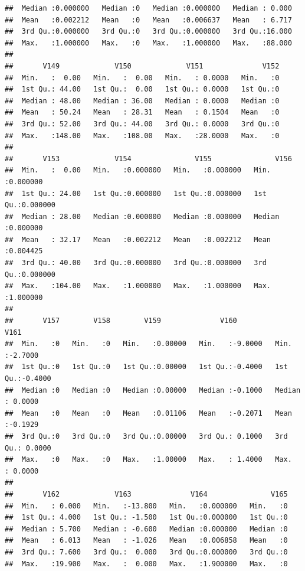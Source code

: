 \documentclass[
]{article}
\begin{document}
\begin{verbatim}
##  Median :0.000000   Median :0   Median :0.000000   Median : 0.000  
##  Mean   :0.002212   Mean   :0   Mean   :0.006637   Mean   : 6.717  
##  3rd Qu.:0.000000   3rd Qu.:0   3rd Qu.:0.000000   3rd Qu.:16.000  
##  Max.   :1.000000   Max.   :0   Max.   :1.000000   Max.   :88.000  
##                                                                    
##       V149             V150             V151              V152  
##  Min.   :  0.00   Min.   :  0.00   Min.   : 0.0000   Min.   :0  
##  1st Qu.: 44.00   1st Qu.:  0.00   1st Qu.: 0.0000   1st Qu.:0  
##  Median : 48.00   Median : 36.00   Median : 0.0000   Median :0  
##  Mean   : 50.24   Mean   : 28.31   Mean   : 0.1504   Mean   :0  
##  3rd Qu.: 52.00   3rd Qu.: 44.00   3rd Qu.: 0.0000   3rd Qu.:0  
##  Max.   :148.00   Max.   :108.00   Max.   :28.0000   Max.   :0  
##                                                                 
##       V153             V154               V155               V156         
##  Min.   :  0.00   Min.   :0.000000   Min.   :0.000000   Min.   :0.000000  
##  1st Qu.: 24.00   1st Qu.:0.000000   1st Qu.:0.000000   1st Qu.:0.000000  
##  Median : 28.00   Median :0.000000   Median :0.000000   Median :0.000000  
##  Mean   : 32.17   Mean   :0.002212   Mean   :0.002212   Mean   :0.004425  
##  3rd Qu.: 40.00   3rd Qu.:0.000000   3rd Qu.:0.000000   3rd Qu.:0.000000  
##  Max.   :104.00   Max.   :1.000000   Max.   :1.000000   Max.   :1.000000  
##                                                                           
##       V157        V158        V159              V160              V161        
##  Min.   :0   Min.   :0   Min.   :0.00000   Min.   :-9.0000   Min.   :-2.7000  
##  1st Qu.:0   1st Qu.:0   1st Qu.:0.00000   1st Qu.:-0.4000   1st Qu.:-0.4000  
##  Median :0   Median :0   Median :0.00000   Median :-0.1000   Median : 0.0000  
##  Mean   :0   Mean   :0   Mean   :0.01106   Mean   :-0.2071   Mean   :-0.1929  
##  3rd Qu.:0   3rd Qu.:0   3rd Qu.:0.00000   3rd Qu.: 0.1000   3rd Qu.: 0.0000  
##  Max.   :0   Max.   :0   Max.   :1.00000   Max.   : 1.4000   Max.   : 0.0000  
##                                                                               
##       V162             V163              V164               V165  
##  Min.   : 0.000   Min.   :-13.800   Min.   :0.000000   Min.   :0  
##  1st Qu.: 4.000   1st Qu.: -1.500   1st Qu.:0.000000   1st Qu.:0  
##  Median : 5.700   Median : -0.600   Median :0.000000   Median :0  
##  Mean   : 6.013   Mean   : -1.026   Mean   :0.006858   Mean   :0  
##  3rd Qu.: 7.600   3rd Qu.:  0.000   3rd Qu.:0.000000   3rd Qu.:0  
##  Max.   :19.900   Max.   :  0.000   Max.   :1.900000   Max.   :0  

\end{verbatim}
\end{document}
